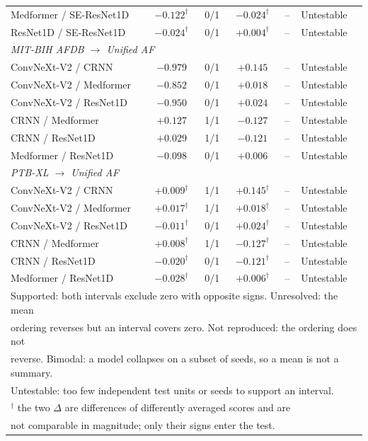 \begin{table}[ht]
\begin{tabular}{lccccl}
Medformer / SE-ResNet1D & $-0.122^{\dagger}$ & 0/1 & $-0.024^{\dagger}$ & -- & Untestable \\
ResNet1D / SE-ResNet1D & $-0.024^{\dagger}$ & 0/1 & $+0.004^{\dagger}$ & -- & Untestable \\
\midrule
\multicolumn{6}{l}{\textit{MIT-BIH AFDB $\rightarrow$ Unified AF}} \\
ConvNeXt-V2 / CRNN & $-0.979$ & 0/1 & $+0.145$ & -- & Untestable \\
ConvNeXt-V2 / Medformer & $-0.852$ & 0/1 & $+0.018$ & -- & Untestable \\
ConvNeXt-V2 / ResNet1D & $-0.950$ & 0/1 & $+0.024$ & -- & Untestable \\
CRNN / Medformer & $+0.127$ & 1/1 & $-0.127$ & -- & Untestable \\
CRNN / ResNet1D & $+0.029$ & 1/1 & $-0.121$ & -- & Untestable \\
Medformer / ResNet1D & $-0.098$ & 0/1 & $+0.006$ & -- & Untestable \\
\midrule
\multicolumn{6}{l}{\textit{PTB-XL $\rightarrow$ Unified AF}} \\
ConvNeXt-V2 / CRNN & $+0.009^{\dagger}$ & 1/1 & $+0.145^{\dagger}$ & -- & Untestable \\
ConvNeXt-V2 / Medformer & $+0.017^{\dagger}$ & 1/1 & $+0.018^{\dagger}$ & -- & Untestable \\
ConvNeXt-V2 / ResNet1D & $-0.011^{\dagger}$ & 0/1 & $+0.024^{\dagger}$ & -- & Untestable \\
CRNN / Medformer & $+0.008^{\dagger}$ & 1/1 & $-0.127^{\dagger}$ & -- & Untestable \\
CRNN / ResNet1D & $-0.020^{\dagger}$ & 0/1 & $-0.121^{\dagger}$ & -- & Untestable \\
Medformer / ResNet1D & $-0.028^{\dagger}$ & 0/1 & $+0.006^{\dagger}$ & -- & Untestable \\
\midrule
\multicolumn{6}{l}{\footnotesize Supported: both intervals exclude zero with opposite signs. Unresolved: the mean} \\
\multicolumn{6}{l}{\footnotesize ordering reverses but an interval covers zero. Not reproduced: the ordering does not} \\
\multicolumn{6}{l}{\footnotesize reverse. Bimodal: a model collapses on a subset of seeds, so a mean is not a summary.} \\
\multicolumn{6}{l}{\footnotesize Untestable: too few independent test units or seeds to support an interval.} \\
\multicolumn{6}{l}{\footnotesize $^{\dagger}$ the two $\Delta$ are differences of differently averaged scores and are} \\
\multicolumn{6}{l}{\footnotesize not comparable in magnitude; only their signs enter the test.} \\
\bottomrule
\end{tabular}
\end{table}

